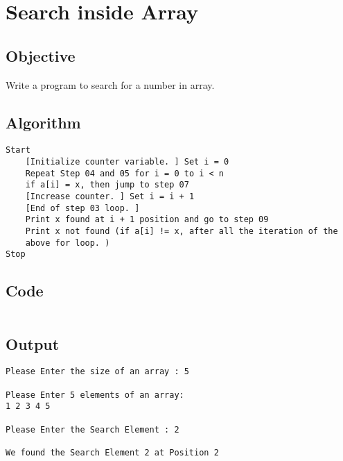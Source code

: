 \section{Search inside Array}
\label{sec:Search inside Array}

\subsection{Objective}
Write a program to search for a number in array.

\subsection{Algorithm}
\begin{lstlisting}[style=mystyle]
Start
    [Initialize counter variable. ] Set i = 0
    Repeat Step 04 and 05 for i = 0 to i < n
    if a[i] = x, then jump to step 07
    [Increase counter. ] Set i = i + 1
    [End of step 03 loop. ]
    Print x found at i + 1 position and go to step 09
    Print x not found (if a[i] != x, after all the iteration of the
    above for loop. )
Stop
\end{lstlisting}

\subsection{Code}
\inputminted[]{c}{../../Code/search.c}

\subsection{Output}
\begin{lstlisting}[style=output]
Please Enter the size of an array : 5

Please Enter 5 elements of an array: 
1 2 3 4 5

Please Enter the Search Element : 2

We found the Search Element 2 at Position 2
\end{lstlisting}

\pagebreak

